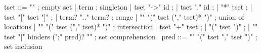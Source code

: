 \begin{syntax}
  tset ::= "\empty" ; empty set
       | term ; singleton
       | tset "->" id ;
       | tset "." id ;
       | "*" tset ;
       | tset "[" tset "]" ;
       | term? ".." term? ; range
       | "\union" "(" tset ("," tset)* ")" ; union of locations
       | "\inter" "(" tset ("," tset)* ")" ; intersection
       | tset "+" tset ;
       | "(" tset ")" ;
       | "{" tset "|" binders (";" pred)? "}" ; set comprehension
       \
  pred ::= {"\subset" "(" tset "," tset ")"} ; set inclusion
\end{syntax}

